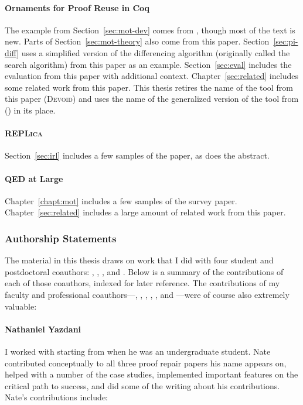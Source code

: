 \paragraph{Ornaments for Proof Reuse in Coq}
The example from Section~\ref{sec:mot-dev} comes from , though most of the text is new.
Parts of Section~\ref{sec:mot-theory} also come from this paper.
Section~\ref{sec:pi-diff} uses a simplified version of the differencing algorithm (originally called the search algorithm) from this paper as an example.
Section~\ref{sec:eval} includes the evaluation from this paper with additional context.
Chapter~\ref{sec:related} includes some related work from this paper.
This thesis retires the name of the tool from this paper (\textsc{Devoid})
and uses the name of the generalized version of the tool from  (\toolnamec) in its place.

\paragraph{\textsc{REPLica}}
Section~\ref{sec:irl} includes a few samples of the  paper, as does the abstract.

\paragraph{QED at Large}
Chapter~\ref{chapt:mot} includes a few samples of the  survey paper.
Chapter~\ref{sec:related} includes a large amount of related work from this paper.

\subsubsection*{Authorship Statements}

The material in this thesis draws on work that I did with
four student and postdoctoral coauthors: , , ,
and .
Below is a summary of the contributions of each of those coauthors,
indexed for later reference.
The contributions of my faculty and professional coauthors---, , ,
, , and ---were of course also extremely valuable:

\paragraph{Nathaniel Yazdani}
I worked with  starting from when he was an undergraduate student.
Nate contributed conceptually to all three proof repair papers his name appears on,
helped with a number of the case studies,
implemented important features on the critical path to success,
and did some of the writing about his contributions.
Nate's contributions include:

